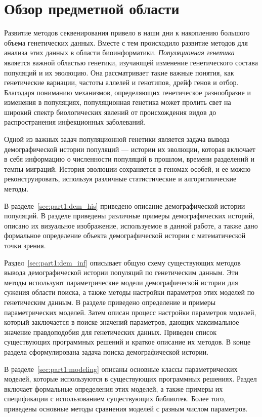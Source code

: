 \chapter{Обзор предметной области}
\label{ch:overview}

Развитие методов секвенирования привело в наши дни к накоплению большого объема генетических данных.
Вместе с тем происходило развитие методов для анализа этих данных в области биоинформатики.
\emph{Популяционная генетика} является важной областью генетики, изучающей изменение генетического состава популяций и их эволюцию. Она рассматривает такие важные понятия, как генетические вариации, частоты аллелей и генотипов, дрейф генов и отбор.
Благодаря пониманию механизмов, определяющих генетическое разнообразие и изменения в популяциях, популяционная генетика может пролить свет на широкий спектр биологических явлений от происхождения видов до распространения инфекционных заболеваний.

Одной из важных задач популяционной генетики является задача вывода демографической истории популяций --- истории их эволюции, которая включает в себя информацию о численности популяций в прошлом, времени разделений и темпы миграций.
История эволюции сохраняется в геномах особей, и ее можно реконструировать, используя различные статистические и алгоритмические методы.

В разделе~\ref{sec:part1:dem_his} приведено описание демографической истории популяций.
В разделе приведены различные примеры демографических историй, описано их визуальное изображение, используемое в данной работе, а также дано формальное определение объекта демографической истории с математической точки зрения.

Раздел~\ref{sec:part1:dem_inf} описывает общую схему существующих методов вывода демографической истории популяций по генетическим данным.
Эти методы используют параметрические модели демографической истории для сужения области поиска, а также методы настройки параметров этих моделей по генетическим данным.
В разделе приведено определение и примеры параметрических моделей.
Затем описан процесс настройки параметров моделей, который заключается в поиске значений параметров, дающих максимальное значение правдоподобия для генетических данных.
Приведен список существующих программных решений и краткое описание их методов.
В конце раздела сформулирована задача поиска демографической истории.

В разделе~\ref{sec:part1:modeling} описаны основные классы параметрических моделей, которые используются в существующих программных решениях.
Раздел включает формальные определения этих моделей, а также примеры их спецификации с использованием существующих библиотек.
Более того, приведены основные методы сравнения моделей с разным числом параметров.

